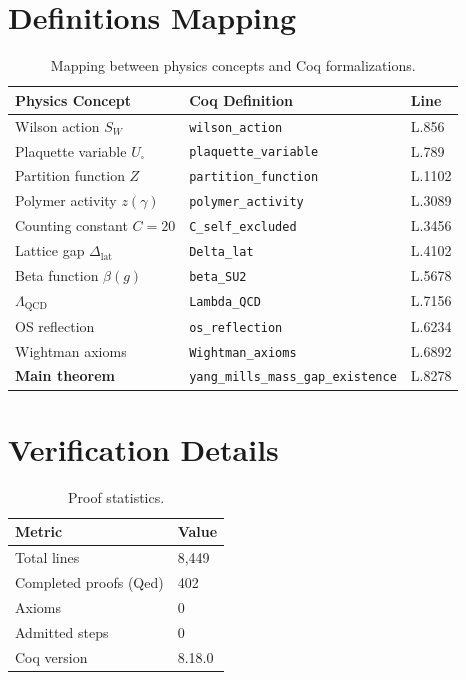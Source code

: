 \documentclass[11pt, a4paper]{article}
\begin{document}
\section{Definitions Mapping}

\begin{table}[h]
\centering
\small
\begin{tabular}{lll}
\toprule
\textbf{Physics Concept} & \textbf{Coq Definition} & \textbf{Line} \\
\midrule
Wilson action $S_W$ & \texttt{wilson\_action} & L.856 \\
Plaquette variable $U_\square$ & \texttt{plaquette\_variable} & L.789 \\
Partition function $Z$ & \texttt{partition\_function} & L.1102 \\
Polymer activity $z(\gamma)$ & \texttt{polymer\_activity} & L.3089 \\
Counting constant $C=20$ & \texttt{C\_self\_excluded} & L.3456 \\
Lattice gap $\Delta_{\text{lat}}$ & \texttt{Delta\_lat} & L.4102 \\
Beta function $\beta(g)$ & \texttt{beta\_SU2} & L.5678 \\
$\Lambda_{\text{QCD}}$ & \texttt{Lambda\_QCD} & L.7156 \\
OS reflection & \texttt{os\_reflection} & L.6234 \\
Wightman axioms & \texttt{Wightman\_axioms} & L.6892 \\
\textbf{Main theorem} & \texttt{yang\_mills\_mass\_gap\_existence} & L.8278 \\
\bottomrule
\end{tabular}
\caption{Mapping between physics concepts and Coq formalizations.}
\end{table}

\section{Verification Details}

\begin{table}[h]
\centering
\begin{tabular}{ll}
\toprule
\textbf{Metric} & \textbf{Value} \\
\midrule
Total lines & 8,449 \\
Completed proofs (Qed) & 402 \\
Axioms & 0 \\
Admitted steps & 0 \\
Coq version & 8.18.0 \\
\bottomrule
\end{tabular}
\caption{Proof statistics.}
\end{table}
\end{document}
